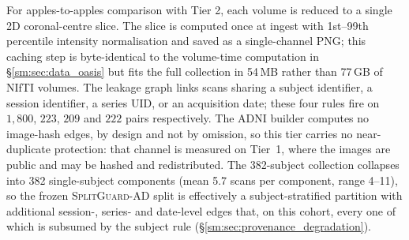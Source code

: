 \documentclass[11pt]{article}
\newcommand{\SGA}{\textsc{SplitGuard-AD}}
\begin{document}
For apples-to-apples comparison with Tier 2, each volume is reduced to
a single 2D coronal-centre slice. The slice is computed once at ingest
with 1st--99th percentile intensity normalisation and saved as a
single-channel PNG; this caching step is byte-identical to the
volume-time computation in \S\ref{sm:sec:data_oasis} but fits the full
collection in 54\,MB rather than 77\,GB of NIfTI volumes. The leakage
graph links scans sharing a subject identifier, a session identifier, a
series UID, or an acquisition date; these four rules fire on $1{,}800$,
$223$, $209$ and $222$ pairs respectively. The ADNI builder computes no
image-hash edges, by design and not by omission, so this tier carries no
near-duplicate protection: that channel is measured on Tier~1, where the
images are public and may be hashed and redistributed. The 382-subject
collection collapses into 382 single-subject components (mean 5.7 scans
per component, range 4--11), so the frozen \SGA{} split is effectively a
subject-stratified partition with additional session-, series- and
date-level edges that, on this cohort, every one of which is subsumed by
the subject rule (\S\ref{sm:sec:provenance_degradation}).
\end{document}
